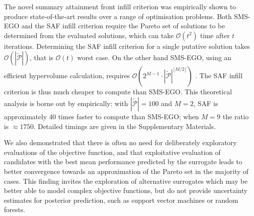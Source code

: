 \documentclass[conference]{IEEEtran}
\newcommand{\nobj}{M}
\newcommand\Papprox{\tilde{\mathcal{P}}}
\begin{document}
The  novel summary attainment front infill criterion  was
empirically shown to produce state-of-the-art results over a range of
 optimisation problems.
 Both SMS-EGO and the SAF infill criterion
require the Pareto set of solutions to be determined from the evaluated
solutions, which can take  $\mathcal{O}(t^2)$ time after $t$
iterations.  Determining the SAF infill criterion for a single putative
solution takes
$\mathcal{O}(|\Papprox|)$, that is $\mathcal{O}(t)$ worst case. On the
other hand SMS-EGO, using an efficient hypervolume calculation, requires
$\mathcal{O}(2^{\nobj-1}\cdot |\Papprox|^{\lfloor \nobj/2 \rfloor})$ \cite{yangetal2019}. The
SAF infill criterion is thus much cheaper to compute than SMS-EGO. This
theoretical analysis is borne out by empirically: with $|\Papprox| = 100 $
and $\nobj = 2$, SAF is approximately 40 times faster to compute than
SMS-EGO; when $\nobj = 9$ the ratio is $\approx 1750$.  Detailed timings are
given in the Supplementary Materials.

We also demonstrated that there is often no need for deliberately exploratory evaluations of the objective function, and that exploitative evaluation of candidates with the best mean performance predicted by the surrogate leads to better convergence towards an approximation of the Pareto set in the majority of cases. This finding invites the exploration of alternative surrogates which may be better able to model complex objective functions, but do not provide uncertainty estimates for posterior prediction, such as support vector machines or random forests.




\end{document}
